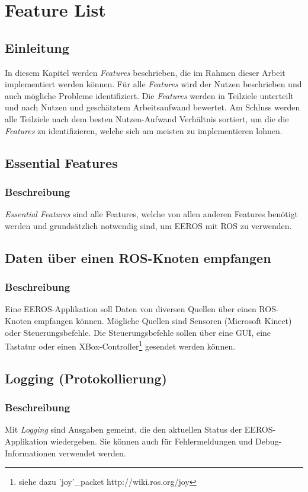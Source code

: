 \chapter{Feature List}
\label{chapter:featureList}
\section{Einleitung}
In diesem Kapitel werden \textit{Features} beschrieben, die im Rahmen dieser Arbeit implementiert werden können.
Für alle \textit{Features} wird der Nutzen beschrieben und auch mögliche Probleme identifiziert.
Die \textit{Features} werden in Teilziele unterteilt und nach Nutzen und geschätztem Arbeitsaufwand bewertet.
Am Schluss werden alle Teilziele nach dem besten Nutzen-Aufwand Verhältnis sortiert, um die die \textit{Features} zu identifizieren, welche sich am meisten zu implementieren lohnen.


\section{Essential Features}
\subsection{Beschreibung}
\textit{Essential Features} sind alle Features, welche von allen anderen Features benötigt werden und grundsätzlich notwendig sind, um EEROS mit ROS zu verwenden.


\section{Daten über einen ROS-Knoten empfangen}
\subsection{Beschreibung}
Eine EEROS-Applikation soll Daten von diversen Quellen über einen ROS-Knoten empfangen können.
Mögliche Quellen sind Sensoren (Microsoft Kinect) oder Steuerungsbefehle.
Die Steuerungsbefehle sollen über eine GUI, eine Tastatur oder einen XBox-Controller\footnote{siehe dazu 'joy'\_packet http://wiki.ros.org/joy} gesendet werden können.


\section{Logging (Protokollierung)}
\subsection{Beschreibung}
Mit \textit{Logging} sind Ausgaben gemeint, die den aktuellen Status der EEROS-Applikation wiedergeben.
Sie können auch für Fehlermeldungen und Debug-Informationen verwendet werden.

